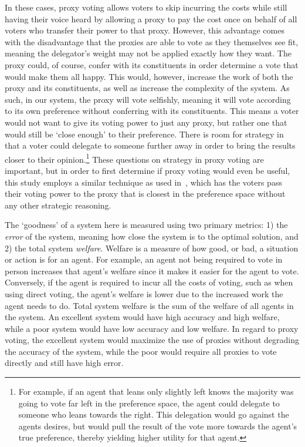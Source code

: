 In these cases, proxy voting allows voters to skip incurring the costs while still
having their voice heard by allowing a proxy to pay the cost once on behalf of all
voters who transfer their power to that proxy.
However, this advantage comes with the disadvantage that the proxies are able to vote
as they themselves see fit, meaning the delegator's weight may not be applied exactly
how they want.
The proxy could, of course, confer with its constituents in order determine a vote
that would make them all happy.
This would, however, increase the work of both the proxy and its constituents, as
well as increase the complexity of the system.
As such, in our system, the proxy will vote selfishly, meaning it will vote according
to its own preference without conferring with its constituents.
This means a voter would not want to give its voting power to just any proxy, but
rather one that would still be `close enough' to their preference.
There is room for strategy in that a voter could delegate to someone further away in
order to bring the results closer to their opinion.\footnote{
    For example, if an agent that leans only slightly left knows the majority was going
    to vote far left in the preference space, the agent could delegate to someone who
    leans towards the right.
    This delegation would go against the agents desires, but would pull the result of
    the vote more towards the agent's true preference, thereby yielding higher
    utility for that agent.
}
These questions on strategy in proxy voting are important, but in order to first
determine if proxy voting would even be useful, this study employs a similar technique
as used in~\cite{Cohensius2017}, which has the voters pass their voting power to the
proxy that is closest in the preference space without any other strategic reasoning.

The `goodness' of a system here is measured using two primary metrics: 1) the
\textit{error} of the system, meaning how close the system is to the optimal
solution, and 2) the total system \textit{welfare}.
Welfare is a measure of how good, or bad, a situation or action is for an agent.
For example, an agent not being required to vote in person increases that agent's
welfare since it makes it easier for the agent to vote.
Conversely, if the agent is required to incur all the costs of voting, such as when
using direct voting, the agent's welfare is lower due to the increased work the agent
needs to do.
Total system welfare is the sum of the welfare of all agents in the system.
An excellent system would have high accuracy and high welfare, while a poor system
would have low accuracy and low welfare.
In regard to proxy voting, the excellent system would maximize the use of proxies
without degrading the accuracy of the system, while the poor would require all
proxies to vote directly and still have high error.

